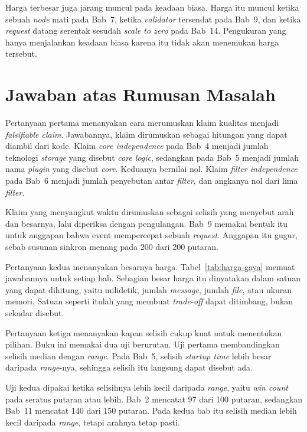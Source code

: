 Harga terbesar juga jarang muncul pada keadaan biasa. Harga itu muncul ketika
sebuah \textit{node} mati pada Bab~7, ketika \textit{validator} tersendat pada
Bab~9, dan ketika \textit{request} datang serentak sesudah \textit{scale to zero}
pada Bab~14. Pengukuran yang hanya menjalankan keadaan biasa karena itu tidak
akan menemukan harga tersebut.

\section*{Jawaban atas Rumusan Masalah}

Pertanyaan pertama menanyakan cara merumuskan klaim kualitas menjadi
\textit{falsifiable claim}. Jawabannya, klaim dirumuskan sebagai hitungan yang
dapat diambil dari kode. Klaim \textit{core independence} pada Bab~4 menjadi
jumlah teknologi \textit{storage} yang disebut \textit{core logic}, sedangkan
pada Bab~5 menjadi jumlah nama \textit{plugin} yang disebut \textit{core}.
Keduanya bernilai nol. Klaim \textit{filter independence} pada Bab~6 menjadi
jumlah penyebutan antar \textit{filter}, dan angkanya nol dari lima
\textit{filter}.

Klaim yang menyangkut waktu dirumuskan sebagai selisih yang menyebut arah dan
besarnya, lalu diperiksa dengan pengulangan. Bab~9 memakai bentuk itu untuk
anggapan bahwa event mempercepat sebuah \textit{request}. Anggapan itu gugur,
sebab susunan sinkron menang pada 200 dari 200 putaran.

Pertanyaan kedua menanyakan besarnya harga. Tabel~\ref{tab:harga-gaya} memuat
jawabannya untuk setiap bab. Sebagian besar harga itu dinyatakan dalam satuan
yang dapat dihitung, yaitu milidetik, jumlah \textit{message}, jumlah
\textit{file}, atau ukuran memori. Satuan seperti itulah yang membuat
\textit{trade-off} dapat ditimbang, bukan sekadar disebut.

Pertanyaan ketiga menanyakan kapan selisih cukup kuat untuk menentukan pilihan.
Buku ini memakai dua uji berurutan. Uji pertama membandingkan selisih median
dengan \textit{range}. Pada Bab~5, selisih \textit{startup time} lebih besar
daripada \textit{range}-nya, sehingga selisih itu langsung dapat disebut ada.

Uji kedua dipakai ketika selisihnya lebih kecil daripada \textit{range}, yaitu
\textit{win count} pada seratus putaran atau lebih. Bab~2 mencatat 97 dari 100
putaran, sedangkan Bab~11 mencatat 140 dari 150 putaran. Pada kedua bab itu
selisih median lebih kecil daripada \textit{range}, tetapi arahnya tetap pasti.

